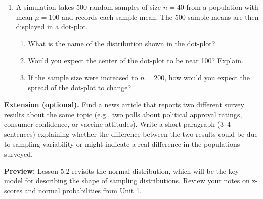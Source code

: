 \documentclass[10pt]{article}
\begin{document}
\begin{enumerate}
  \item A simulation takes 500 random samples of size $n = 40$ from a population with
        mean $\mu = 100$ and records each sample mean. The 500 sample means are then
        displayed in a dot-plot.

        \begin{enumerate}[label=\alph*.]
          \item What is the name of the distribution shown in the dot-plot?
                \blank{7cm}
          \item Would you expect the center of the dot-plot to be near 100? Explain.
          \item If the sample size were increased to $n = 200$, how would you expect
                the spread of the dot-plot to change? 
        \end{enumerate}

\end{enumerate}

\begin{extensionbox}
\textbf{Extension (optional).} Find a news article that reports two different survey
results about the same topic (e.g., two polls about political approval ratings, consumer
confidence, or vaccine attitudes). Write a short paragraph (3--4 sentences) explaining
whether the difference between the two results could be due to sampling variability or
might indicate a real difference in the populations surveyed.
\end{extensionbox}

\begin{reflectionbox}
\textbf{Preview:} Lesson 5.2 revisits the normal distribution, which will be the key
model for describing the shape of sampling distributions. Review your notes on
z-scores and normal probabilities from Unit 1.
\end{reflectionbox}
\end{document}
